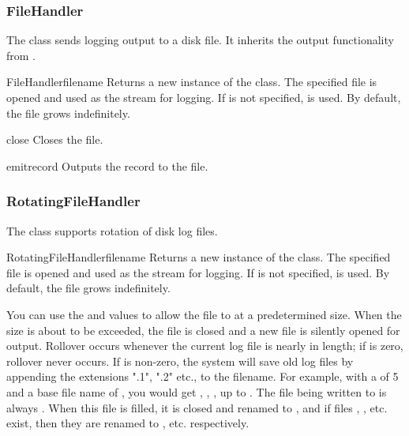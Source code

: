 \subsubsection{FileHandler}

The  class sends logging output to a disk file.
It inherits the output functionality from .

\begin{classdesc}{FileHandler}{filename}
Returns a new instance of the  class. The specified
file is opened and used as the stream for logging. If  is
not specified,  is used. By default, the file grows
indefinitely.
\end{classdesc}

\begin{methoddesc}{close}{}
Closes the file.
\end{methoddesc}

\begin{methoddesc}{emit}{record}
Outputs the record to the file.
\end{methoddesc}

\subsubsection{RotatingFileHandler}

The  class supports rotation of disk log files.

\begin{classdesc}{RotatingFileHandler}{filename}
Returns a new instance of the  class. The
specified file is opened and used as the stream for logging. If
 is not specified,  is used. By default, the
file grows indefinitely.

You can use the  and
 values to allow the file to  at a
predetermined size. When the size is about to be exceeded, the file is
closed and a new file is silently opened for output. Rollover occurs
whenever the current log file is nearly  in length; if
 is zero, rollover never occurs.  If 
is non-zero, the system will save old log files by appending the
extensions ".1", ".2" etc., to the filename. For example, with
a  of 5 and a base file name of
, you would get ,
, , up to . The file being
written to is always .  When this file is filled, it is
closed and renamed to , and if files ,
, etc.  exist, then they are renamed to ,
 etc.  respectively.
\end{classdesc}

